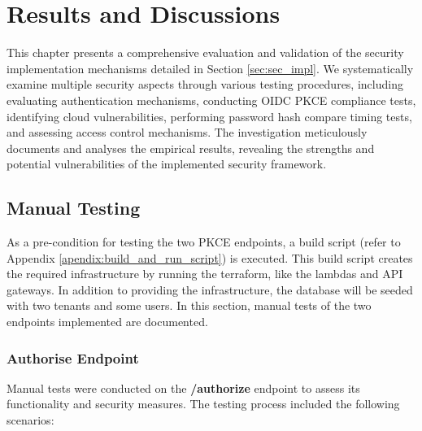 \chapter{Results and Discussions}

This chapter presents a comprehensive evaluation and validation of the security implementation mechanisms detailed in Section \ref{sec:sec_impl}. We systematically examine multiple security aspects through various testing procedures, including evaluating authentication mechanisms, conducting OIDC PKCE compliance tests, identifying cloud vulnerabilities, performing password hash compare timing tests, and assessing access control mechanisms. The investigation meticulously documents and analyses the empirical results, revealing the strengths and potential vulnerabilities of the implemented security framework.


\section{Manual Testing}
As a pre-condition for testing the two PKCE endpoints, a build script (refer to Appendix \ref{apendix:build_and_run_script}) is executed. This build script creates the required infrastructure by running the terraform, like the lambdas and API gateways. In addition to providing the infrastructure, the database will be seeded with two tenants and some users. In this section, manual tests of the two endpoints implemented are documented.


\subsection{Authorise Endpoint}
Manual tests were conducted on the \textbf{/authorize} endpoint to assess its functionality and security measures. The testing process included the following scenarios:

